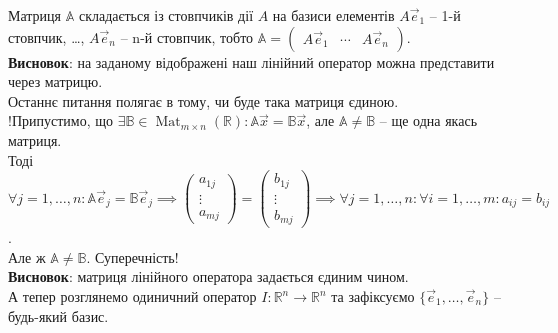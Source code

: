 \documentclass[a4paper, 10pt]{article}
\theoremstyle{theoremdd}
\newtheorem{definition}[theorem]{Definition}
\DeclareMathOperator{\Mat}{Mat}
\begin{document}
	Матриця $\mathbb{A}$ складається із стовпчиків дії $A$ на базиси елементів $A\vec{e}_1$ -- 1-й стовпчик, \dots, $A\vec{e}_n$ -- n-й стовпчик, тобто $\mathbb{A} = \begin{pmatrix} A\vec{e}_1 & \cdots & A\vec{e}_n \end{pmatrix}$.\\
	\textbf{Висновок}: на заданому відображені наш лінійний оператор можна представити через матрицю.
	\bigskip \\
	Останнє питання полягає в тому, чи буде така матриця єдиною.\\
	!Припустимо, що $\exists \mathbb{B} \in \Mat_{m \times n}(\mathbb{R}): \mathbb{A} \vec{x} = \mathbb{B} \vec{x}$, але $\mathbb{A} \neq \mathbb{B}$ -- ще одна якась матриця.\\
	Тоді $\forall j =1,\dots,n: \mathbb{A} \vec{e}_j = \mathbb{B} \vec{e}_j \implies \begin{pmatrix} a_{1j} \\ \vdots \\ a_{mj} \end{pmatrix} = \begin{pmatrix} b_{1j} \\ \vdots \\ b_{mj} \end{pmatrix} \implies \forall j=1,\dots,n: \forall i = 1,\dots,m: a_{ij} = b_{ij}$.\\
	Але ж $\mathbb{A} \neq \mathbb{B}$. Суперечність! \\
	\textbf{Висновок}: матриця лінійного оператора задається єдиним чином.
	\bigskip \\
	\iffalse
	\begin{definition}
	\textbf{Матрицею лінійного оператора} називають матрицю, що містить розклад кожного елементу $A \vec{e}_1, \dots, A \vec{e}_n$.
	\begin{align*}
	\mathbb{A} = \begin{pmatrix}
	A\vec{e}_1 & \dots & A\vec{e}_n
\end{pmatrix} = \begin{pmatrix}
	a_{11} & \dots & a_{1n} \\
	\vdots & \ddots & \vdots \\
	a_{m1} & \dots & a_{mn} \\
	\end{pmatrix}
	\end{align*}
	\end{definition}
	\noindent
	\fi
	А тепер розглянемо одиничний оператор $I \colon \mathbb{R}^n \to \mathbb{R}^n$ та зафіксуємо $\{\vec{e}_1, \dots, \vec{e}_n\}$ -- будь-який базис.\\
\end{document}
